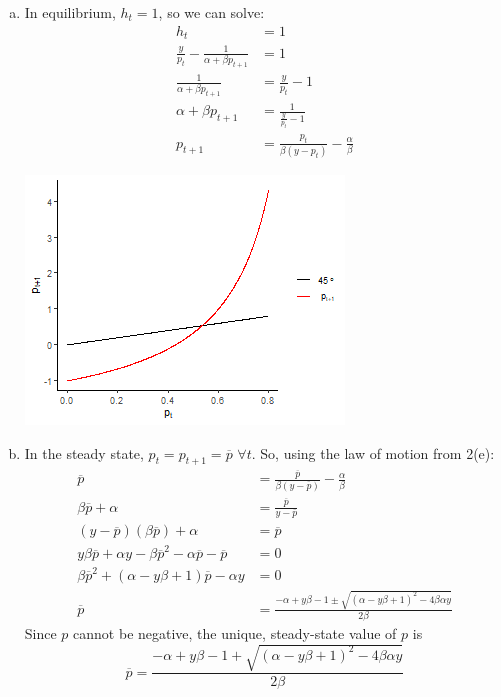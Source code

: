 \documentclass{article}
\newcommand{\olp}{\overline{p}}
\begin{document}
\begin{enumerate}
\begin{enumerate}[(a)]
			\item In equilibrium, $h_t=1$, so we can solve:
				\begin{align*}
					h_t		&= 1	\\
					\frac{y}{p_t} - \frac{1}{\alpha + \beta p_{t+1}} &= 1 	\\
					\frac{1}{\alpha + \beta p_{t+1}} &= \frac{y}{p_t} - 1  	\\
					\alpha + \beta p_{t+1} &= \frac{1}{\frac{y}{p_t} - 1}	\\
					p_{t+1} &= \frac{p_t}{\beta(y-p_t)} - \frac{\alpha}{\beta}
				\end{align*}
				\begin{center}
					\includegraphics{priceplot.png}
				\end{center}
				
			\item In the steady state, $p_t = p_{t+1}=\overline{p}$ $\forall t$. So, using the law of motion from 2(e):
				\begin{align*}
					\olp &= \frac{\olp}{\beta(y-\olp)} - \frac{\alpha}{\beta}	\\
					\beta\olp + \alpha &= \frac{\olp}{y-\olp}	\\
					(y-\olp)(\beta\olp) + \alpha &= \olp	\\
					y\beta\olp + \alpha y - \beta\olp^2-\alpha\olp - \olp &= 0	\\
					\beta\olp^2 + (\alpha-y\beta + 1)\olp - \alpha y &= 0		\\
					\olp &= \frac{-\alpha+y\beta - 1 \pm\sqrt{(\alpha-y\beta + 1)^2-4\beta\alpha y}}{2\beta}
				\end{align*}
				Since $p$ cannot be negative, the unique, steady-state value of $p$ is
				\[
					\olp = \frac{-\alpha+y\beta - 1 +\sqrt{(\alpha-y\beta + 1)^2-4\beta\alpha y}}{2\beta}
				\]
				

\end{enumerate}
\end{enumerate}
\end{document}
